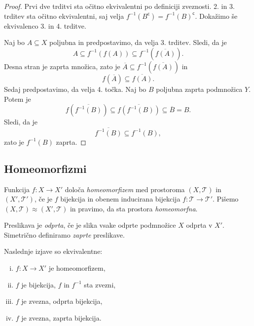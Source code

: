 \begin{proof}
Prvi dve trditvi sta očitno ekvivalentni po definiciji zveznosti.
2. in 3. trditev sta očitno ekvivalentni, saj velja
$f^{-1}(B^\mathsf{c}) = f^{-1}(B)^\mathsf{c}$. Dokažimo še
ekvivalenco 3. in 4. trditve.

Naj bo $A\subseteq X$ poljubna in predpostavimo, da velja 3.
trditev. Sledi, da je
\[
A \subseteq f^{-1}(f(A)) \subseteq f^{-1}(\overline{f(A)}).
\]
Desna stran je zaprta množica, zato je
$\overline{A} \subseteq f^{-1}(\overline{f(A)})$ in
\[
f(\overline{A}) \subseteq \overline{f(A)}.
\]
Sedaj predpostavimo, da velja 4. točka. Naj bo $B$ poljubna zaprta
podmnožica $Y$. Potem je
\[
f(\overline{f^{-1}(B)}) \subseteq \overline{f(f^{-1}(B))}
\subseteq \overline{B} = B.
\]
Sledi, da je
\[
\overline{f^{-1}(B)} \subseteq f^{-1}(B),
\]
zato je $f^{-1}(B)$ zaprta.
\end{proof}

\newpage

\subsection{Homeomorfizmi}


\begin{okvir}
\begin{definicija}
Funkcija $f \colon X \to X'$ določa
\emph{homeomorfizem}
med prostoroma $(X,\mathcal{T})$ in $(X',\mathcal{T}')$, če je $f$
bijekcija in obenem inducirana bijekcija
$f \colon \mathcal{T} \to \mathcal{T}'$. Pišemo
$(X,\mathcal{T}) \approx (X',\mathcal{T})$ in pravimo, da sta
prostora \emph{homeomorfna}.
\end{definicija}
\end{okvir}

\begin{definicija}
Preslikava je \emph{odprta}, če je
slika vsake odprte podmnožice $X$ odprta v $X'$. Simetrično
definiramo \emph{zaprte} preslikave.
\end{definicija}

\begin{trditev}
Naslednje izjave so ekvivalentne:

\begin{enumerate}[i)]
\item $f \colon X \to X'$ je homeomorfizem,
\item $f$ je bijekcija, $f$ in $f^{-1}$ sta zvezni,
\item $f$ je zvezna, odprta bijekcija,
\item $f$ je zvezna, zaprta bijekcija.
\end{enumerate}
\end{trditev}

